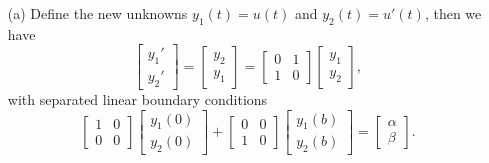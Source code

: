 \begin{sol}
  \begin{itemize}
  \item[(a)]
  Define the new unknowns $y_1(t)=u(t)$ and $y_2(t)=u'(t)$,
  then we have
  \begin{displaymath}
    \begin{bmatrix}
      y_1' \\
      y_2'
    \end{bmatrix}
    =
    \begin{bmatrix}
      y_2 \\
      y_1
    \end{bmatrix}
    =
    \begin{bmatrix}
      0 & 1 \\
      1 & 0
    \end{bmatrix}
    \begin{bmatrix}
      y_1 \\
      y_2
    \end{bmatrix},
  \end{displaymath}
  with separated linear boundary conditions
  \begin{displaymath}
    \begin{bmatrix}
      1 & 0 \\
      0 & 0
    \end{bmatrix}
    \begin{bmatrix}
      y_1(0) \\
      y_2(0)
    \end{bmatrix}
    +
    \begin{bmatrix}
      0 & 0 \\
      1 & 0
    \end{bmatrix}
    \begin{bmatrix}
      y_1(b) \\
      y_2(b)
    \end{bmatrix}
    =
    \begin{bmatrix}
      \alpha \\
      \beta
    \end{bmatrix}.
  \end{displaymath}


\end{itemize}
\end{sol}
